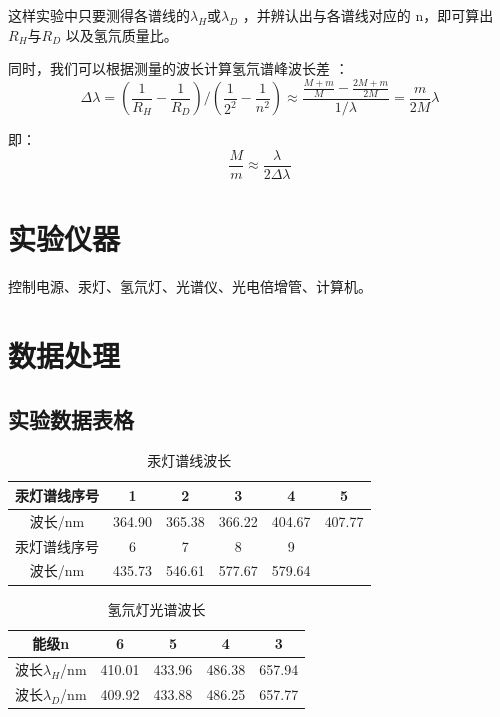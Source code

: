 \documentclass{report}
\begin{document}
这样实验中只要测得各谱线的$ \lambda_H $或$ \lambda_D $ ，并辨认出与各谱线对应的 n，即可算出$ R_H $与$ R_D $
以及氢氘质量比。


同时，我们可以根据测量的波长计算氢氘谱峰波长差 ：
 	\begin{equation}
\Delta \lambda=(\frac{1}{R_H}-\frac{1}{R_D})/(\frac{1}{2^2}-\frac{1}{n^2})\approx\dfrac{\frac{M+m}{M}-\frac{2M+m}{2M}}{1/\lambda}=\frac{m}{2M}\lambda
\end{equation}


即：
 	\begin{equation}
\frac{M}{m}\approx\frac{\lambda}{2\Delta\lambda}
\end{equation}
	\section{实验仪器}
控制电源、汞灯、氢氘灯、光谱仪、光电倍增管、计算机。
	\section{数据处理}
	\subsection{实验数据表格}
\begin{table}[!h]
		\centering
	\caption{\heiti{}汞灯谱线波长}
	\begin{tabular}{|c|c|c|c|c|c|}
		
		\hline
		汞灯谱线序号&1&2&3&4&5\\
				\hline
		波长/nm&364.90&365.38&366.22&404.67&407.77\\
				\hline
		汞灯谱线序号&6&7&8&9&\\
				\hline
		波长/nm&435.73&546.61&577.67&579.64&\\
				\hline
	\end{tabular}
\end{table}
	\begin{table}[!h]
		\centering
		\caption{\heiti{}氢氘灯光谱波长}
		\begin{tabular}{|c|c|c|c|c|}
			
			\hline
			能级n&6&5&4&3\\
			\hline
			波长$ \lambda_H $/nm&410.01&433.96&486.38&657.94\\
			\hline
		
			波长$ \lambda_D $/nm&409.92&433.88&486.25&657.77\\
			\hline
		\end{tabular}
	\end{table}
\end{document}
